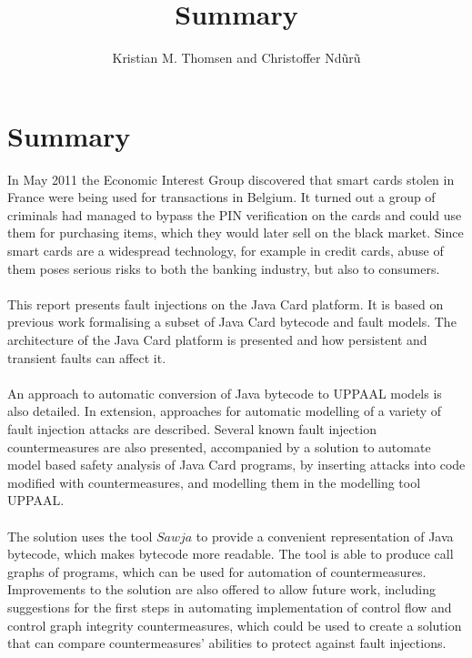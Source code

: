 \documentclass{article}
\begin{document}
\title{Summary}
\author{Kristian M. Thomsen and Christoffer Nd\~ur\~u}
\maketitle

\section{Summary}
In May 2011 the Economic Interest Group discovered that smart cards stolen in France were being used for transactions in Belgium. It turned out a group of criminals had managed to bypass the PIN verification on the cards and could use them for purchasing items, which they would later sell on the black market. Since smart cards are a widespread technology, for example in credit cards, abuse of them poses serious risks to both the banking industry, but also to consumers.\\\\
This report presents fault injections on the Java Card platform. It is based on previous work formalising a subset of Java Card bytecode and fault models. The architecture of the Java Card platform is presented and how persistent and transient faults can affect it.\\\\
An approach to automatic conversion of Java bytecode to UPPAAL models is also detailed. In extension, approaches for automatic modelling of a variety of fault injection attacks are described.
Several known fault injection countermeasures are also presented, accompanied by a solution to automate model based safety analysis of Java Card programs, by inserting attacks into code modified with countermeasures, and modelling them in the modelling tool UPPAAL.\\\\
The solution uses the tool $Sawja$ to provide a convenient representation of Java bytecode, which makes bytecode more readable. The tool is able to produce call graphs of programs, which can be used for automation of countermeasures. Improvements to the solution are also offered to allow future work, including suggestions for the first steps in automating implementation of control flow and control graph integrity countermeasures, which could be used to create a solution that can compare countermeasures' abilities to protect against fault injections.
\end{document}

